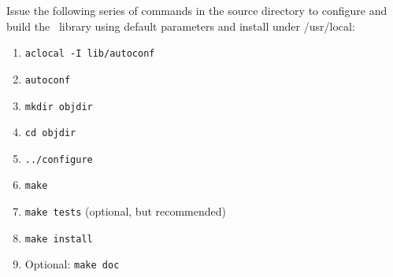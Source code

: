 \documentclass[12pt]{article}
\begin{document}
Issue the following series of commands in the source directory to configure and build the \LIBINT\
library using default parameters and install under /usr/local:

\begin{enumerate}
\item {\tt aclocal -I lib/autoconf}
\item {\tt autoconf}
\item {\tt mkdir objdir}
\item {\tt cd objdir}
\item {\tt ../configure}
\item {\tt make}
\item {\tt make tests} (optional, but recommended)
\item {\tt make install}
\item Optional: {\tt make doc}
\end{enumerate}
\end{document}
